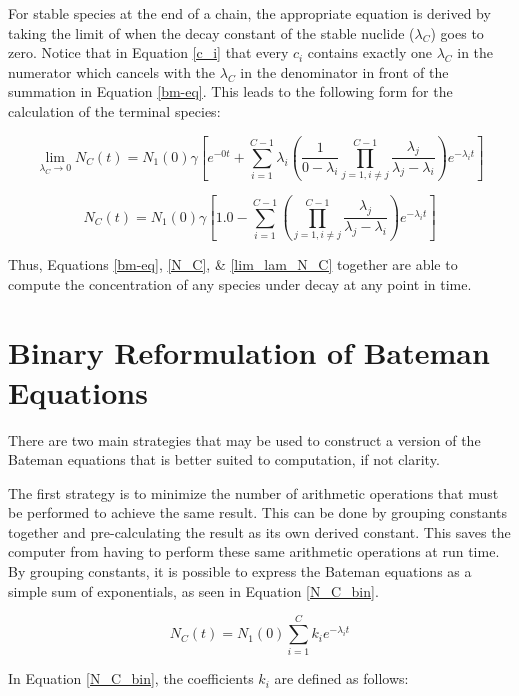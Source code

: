 \documentclass{anstrans}
\begin{document}
For stable species at the end of a chain, the appropriate equation is derived 
by taking the limit of when the decay constant of the stable nuclide 
($\lambda_C$) goes to zero.  Notice that in Equation \ref{c_i} that every $c_i$ contains exactly one $\lambda_C$
in the numerator which cancels with the $\lambda_C$ in the denominator 
in front of the summation in Equation \ref{bm-eq}. This leads to the following form 
for the calculation of the terminal species:

\begin{equation}
\label{lim_lam}
\lim_{\lambda_C \to 0} N_C(t) = N_1(0)  \gamma \left[e^{-0t} + \sum_{i=1}^{C-1} \lambda_i \left(\frac{1}{0 - \lambda_i} \prod_{j=1,i\ne j}^{C-1} \frac{\lambda_j}{\lambda_j - \lambda_i} \right) e^{-\lambda_i t} \right]
\end{equation}

\begin{equation}
\label{lim_lam_N_C}
N_C(t) = N_1(0)  \gamma \left[1.0 - \sum_{i=1}^{C-1} \left(\prod_{j=1,i\ne j}^{C-1} \frac{\lambda_j}{\lambda_j - \lambda_i} \right) e^{-\lambda_i t} \right]
\end{equation}

Thus, Equations \ref{bm-eq}, \ref{N_C}, \& \ref{lim_lam_N_C} together are
able to compute the concentration of any species under decay 
at any point in time.

\section{Binary Reformulation of Bateman Equations}
\label{bin}
There are two main strategies that may be used to construct a version of the 
Bateman equations that is better suited to computation, if not clarity. 

The first strategy is to minimize the number of arithmetic
operations that must be performed to achieve the same result. 
This can be done by grouping constants together and pre-calculating the 
result as its own derived constant. This saves the 
computer from having to perform these same arithmetic operations at run time.  
By grouping constants, it is possible to express the Bateman equations as a 
simple sum of exponentials, as seen in Equation \ref{N_C_bin}.

\begin{equation}
\label{N_C_bin}
N_C(t) = N_1(0) \sum_{i=1}^C k_{i} e^{-\lambda_i t}
\end{equation}

In Equation \ref{N_C_bin}, the coefficients $k_i$ are defined as follows:
\end{document}
